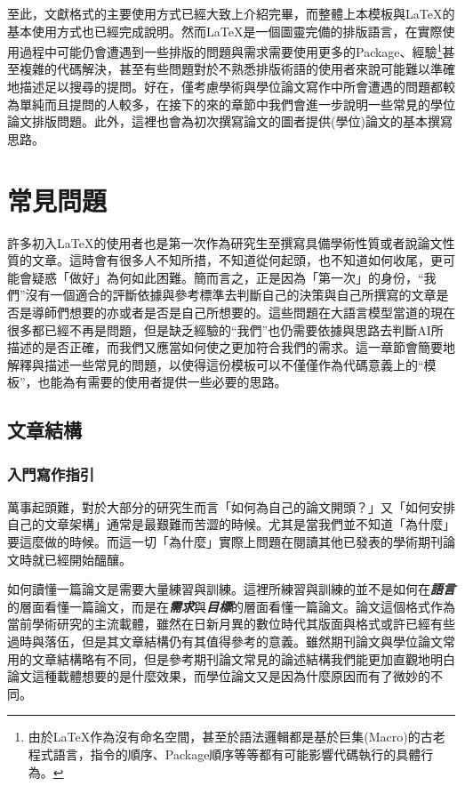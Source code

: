 \documentclass[12pt]{report}
\theoremstyle{plain}
\begin{document}
至此，\BibTeX 文獻格式的主要使用方式已經大致上介紹完畢，而整體上本模板與\LaTeX 的基本使用方式也已經完成說明。然而\LaTeX 是一個圖靈完備的排版語言，在實際使用過程中可能仍會遭遇到一些排版的問題與需求需要使用更多的Package、經驗\footnote{由於\LaTeX 作為沒有命名空間，甚至於語法邏輯都是基於巨集(Macro)的古老程式語言，指令的順序、Package順序等等都有可能影響代碼執行的具體行為。}甚至複雜的代碼解決，甚至有些問題對於不熟悉排版術語的使用者來說可能難以準確地描述足以搜尋的提問。好在，僅考慮學術與學位論文寫作中所會遭遇的問題都較為單純而且提問的人較多，在接下的來的章節中我們會進一步說明一些常見的學位論文排版問題。此外，這裡也會為初次撰寫論文的圖者提供(學位)論文的基本撰寫思路。

\chapter{常見問題}

許多初入\LaTeX 的使用者也是第一次作為研究生至撰寫具備學術性質或者說論文性質的文章。這時會有很多人不知所措，不知道從何起頭，也不知道如何收尾，更可能會疑惑「做好」為何如此困難。簡而言之，正是因為「第一次」的身份，``我們''沒有一個適合的評斷依據與參考標準去判斷自己的決策與自己所撰寫的文章是否是導師們想要的亦或者是否是自己所想要的。這些問題在大語言模型當道的現在很多都已經不再是問題，但是缺乏經驗的``我們''也仍需要依據與思路去判斷AI所描述的是否正確，而我們又應當如何使之更加符合我們的需求。這一章節會簡要地解釋與描述一些常見的問題，以使得這份模板可以不僅僅作為代碼意義上的``模板''，也能為有需要的使用者提供一些必要的思路。

\section{文章結構}

\subsection{入門寫作指引}

萬事起頭難，對於大部分的研究生而言「如何為自己的論文開頭？」又「如何安排自己的文章架構」通常是最艱難而苦澀的時候。尤其是當我們並不知道「為什麼」要這麼做的時候。而這一切「為什麼」實際上問題在閱讀其他已發表的學術期刊論文時就已經開始醞釀。

如何讀懂一篇論文是需要大量練習與訓練。這裡所練習與訓練的並不是如何在\textit{\textbf{語言}}的層面看懂一篇論文，而是在\textbf{\textit{需求}}與\textit{\textbf{目標}}的層面看懂一篇論文。論文這個格式作為當前學術研究的主流載體，雖然在日新月異的數位時代其版面與格式或許已經有些過時與落伍，但是其文章結構仍有其值得參考的意義。雖然期刊論文與學位論文常用的文章結構略有不同，但是參考期刊論文常見的論述結構我們能更加直觀地明白論文這種載體想要的是什麼效果，而學位論文又是因為什麼原因而有了微妙的不同。
\end{document}
